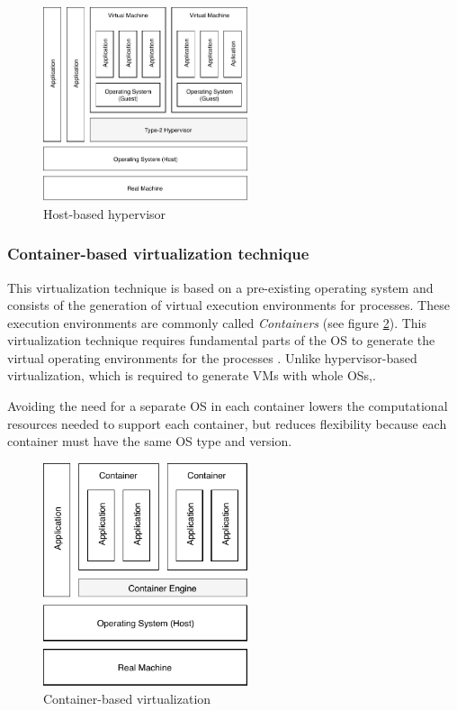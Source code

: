 	\begin{figure}[H]
		\centering
		\includegraphics[width=6cm]{images/hosted-BasedHypervisor.pdf}
		\vspace{-0.2cm}
		\caption{Host-based hypervisor}
		\label{fig:host-basedHypervisor}
	\end{figure}
	
	\subsubsection {Container-based virtualization technique}
	
	This virtualization technique is based on a pre-existing operating system and consists of the generation of virtual execution environments for processes. 
	These execution environments are commonly called \textit{Containers} (see figure \ref{fig:container-baseVirtualization}). This virtualization technique requires fundamental parts of the OS to generate the virtual operating environments for the processes \cite{Kon2017}.
	Unlike hypervisor-based virtualization, which is required to generate VMs with whole OSs,\cite{Kon2017}. 
	
	
	Avoiding the need for a separate OS in each container lowers the computational resources needed to support each container, but reduces flexibility because each container must have the same OS type and version. 

	\begin{figure}[H]
		\centering
		\includegraphics[width=6cm]{images/container-BasedVirtualization.pdf}
		\vspace{-0.2cm}
		\caption{Container-based virtualization}
		\label{fig:container-baseVirtualization}
	\end{figure}
	
